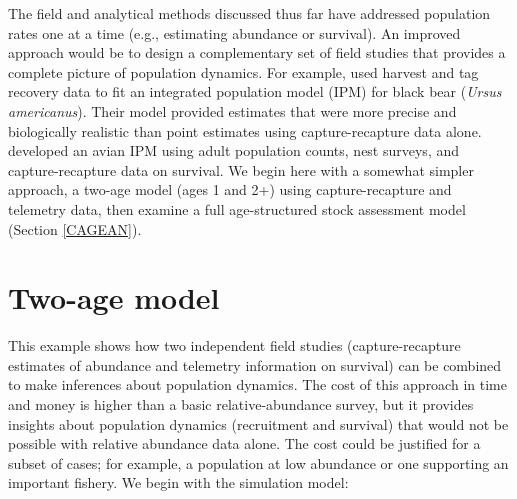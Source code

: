 \documentclass[
]{krantz}
\begin{document}
The field and analytical methods discussed thus far have addressed population rates one at a time (e.g., estimating abundance or survival). An improved approach would be to design a complementary set of field studies that provides a complete picture of population dynamics. For example, \citet{conn.etal_2008} used harvest and tag recovery data to fit an integrated population model (IPM) for black bear (\emph{Ursus americanus}). Their model provided estimates that were more precise and biologically realistic than point estimates using capture-recapture data alone. \citet{kéry.schaub_2011} developed an avian IPM using adult population counts, nest surveys, and capture-recapture data on survival. We begin here with a somewhat simpler approach, a two-age model (ages 1 and 2+) using capture-recapture and telemetry data, then examine a full age-structured stock assessment model (Section \ref{CAGEAN}).

\hypertarget{TwoAge}{%
\section{Two-age model}\label{TwoAge}}

This example shows how two independent field studies (capture-recapture estimates of abundance and telemetry information on survival) can be combined to make inferences about population dynamics. The cost of this approach in time and money is higher than a basic relative-abundance survey, but it provides insights about population dynamics (recruitment and survival) that would not be possible with relative abundance data alone. The cost could be justified for a subset of cases; for example, a population at low abundance or one supporting an important fishery. We begin with the simulation model:
\end{document}
